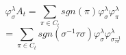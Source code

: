 \documentclass[12pt,a4paper]{article}
\begin{document}
\begin{fleqn}
\[
\varphi^{\lambda}_\sigma A_{t}=\sum_{\pi \in C_{t}} sgn(\pi) \varphi^{\lambda}_{\sigma} \varphi^{\lambda}_{\pi}
\]
\[
=\sum_{\pi \in C_{t}} sgn(\sigma^{-1} \tau \sigma)\varphi^{\lambda}_{\sigma}\varphi^{\lambda}_{{\sigma}^{-1}_{\tau \sigma}}
\]

\end{fleqn}
\end{document}
